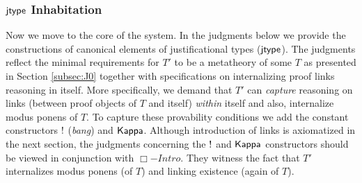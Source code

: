 \documentclass[11pt]{entcs}
\newcommand{\TurnTwo}[2]
	{ {#1}\vdash_{\textbf{\sf J}}  {#2}}
\newcommand{\Turnjc}[3]
    { {#1};{#2}\vdash_{\textbf{\sf JC}}  {#3}}
\begin{document}
{\subsubsection{${\sf jtype}$ Inhabitation}




Now we move to the core of the system. In the judgments below we provide the constructions of canonical elements of justificational types (${\sf jtype}$). The judgments reflect  the minimal requirements for $T'$ to be a metatheory of some $T$ as presented  in Section \ref{subsec:J0} together with specifications on internalizing proof links reasoning in itself. More specifically, we demand that $T'$ can \textit{capture} reasoning on links (between proof objects of $T$ and itself) \textit {within} itself and also, internalize modus ponens of $T$.  To capture these provability conditions we add the constant constructors ${\sf !}$ (\textit{bang}) and  ${\sf Kappa}$. Although introduction of links is axiomatized in the next section, the judgments concerning the ${\sf !}$ and ${\sf Kappa}$ constructors should be viewed in conjunction with $\Box-Intro$. They witness the fact that $T'$ internalizes modus ponens (of $T$)  and linking existence  (again of $T$).  






}
\end{document}
